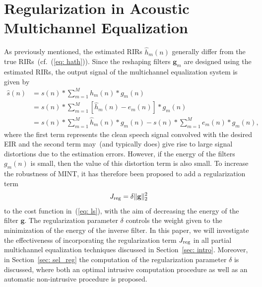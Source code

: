 \documentclass[10pt]{IEEEtran}
\begin{document}
\section{Regularization in Acoustic Multichannel Equalization}
\label{sec: reg}
As previously mentioned, the estimated RIRs $\hat{h}_m(n)$ generally differ from the true RIRs~(cf.~(\ref{eq: hath})).
Since the reshaping filters $\mathbf{g}_m$ are designed using the estimated RIRs, the output signal of the multichannel equalization system is given by
\begin{align}
\hat{s}(n)  &= s(n) \ast \sum_{m=1}^M h_m(n) \ast g_m(n) \\
& = s(n) \ast \sum_{m=1}^M  \left[\hat{h}_m(n) - e_m(n)\right] \ast g_m(n) \\
\label{eq: 2}
& = s(n) \ast \sum_{m=1}^M \hat{h}_m(n) \ast g_m(n) - s(n) \ast \sum_{m=1}^M e_m(n) \ast g_m(n),
\end{align}
where the first term represents the clean speech signal convolved with the desired EIR and the second term may~(and typically does) give rise to large signal distortions due to the estimation errors.
However, if the energy of the filters $g_m(n)$ is small, then the value of this distortion term is also small.
To increase the robustness of MINT, it has therefore been proposed to add a regularization term
\begin{equation}
\label{eq: regterm}
J_{\rm reg} = \delta \|\mathbf{g}\|_2^2
\end{equation}
to the cost function in~(\ref{eq: ls}), with the aim of decreasing the energy of the filter $\mathbf{g}$.
The regularization parameter $\delta$ controls the weight given to the minimization of the energy of the inverse filter.
In this paper, we will investigate the effectiveness of incorporating the regularization term $J_{\rm reg}$ in all partial multichannel equalization techniques discussed in Section~\ref{sec: intro}.
Moreover, in Section~\ref{sec: sel_reg} the computation of the regularization parameter $\delta$ is discussed, where both an optimal intrusive computation procedure as well as an automatic non-intrusive procedure is proposed.
\end{document}
